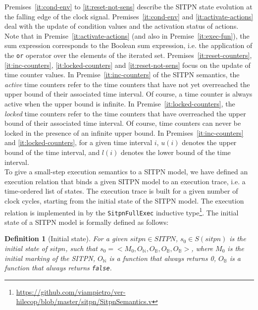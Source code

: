 \documentclass[pdflatex,sn-mathphys]{sn-jnl}%
\theoremstyle{thmstyleone}%
\theoremstyle{thmstyletwo}%
\theoremstyle{thmstylethree}%
\newtheorem{definition}{Definition}%
\begin{document}
Premises~\ref{it:cond-env} to \ref{it:reset-not-sens} describe the
SITPN state evolution at the falling edge of the clock
signal. Premises~\ref{it:cond-env} and \ref{it:activate-actions} deal
with the update of condition values and the activation status of
actions. Note that in Premise~\ref{it:activate-actions} (and also in
Premise~\ref{it:exec-fun}), the sum expression corresponds to the
Boolean sum expression, i.e. the application of the \texttt{or}
operator over the elements of the iterated
set. Premises~\ref{it:reset-counters}, \ref{it:inc-counters},
\ref{it:locked-counters} and \ref{it:reset-not-sens} focus on the
update of time counter values.  In Premise~\ref{it:inc-counters} of
the SITPN semantics, the \emph{active} time counters refer to the time
counters that have not yet overreached the upper bound of their
associated time interval. Of course, a time counter is always active
when the upper bound is infinite. In Premise~\ref{it:locked-counters},
the \emph{locked} time counters refer to the time counters that have
overreached the upper bound of their associated time interval. Of
course, time counters can never be locked in the presence of an
infinite upper bound. In Premises~\ref{it:inc-counters} and
\ref{it:locked-counters}, for a given time interval $i$, $u(i)$
denotes the upper bound of the time interval, and $l(i)$ denotes the
lower bound of the time interval.\\

To give a small-step execution semantics to a SITPN model, we have
defined an execution relation that binds a given SITPN model to an
execution trace, i.e. a time-ordered list of states. The execution
trace is built for a given number of clock cycles, starting from the
initial state of the SITPN model. The execution relation is
implemented in \coq{} by the \texttt{SitpnFullExec} inductive
type\footnote{\url{https://github.com/viampietro/ver-hilecop/blob/master/sitpn/SitpnSemantics.v}}. The
initial state of a SITPN model is formally defined as follows:


\begin{definition}[Initial state]
  \label{def:sitpn-init-state}
  For a given $sitpn\in{}SITPN$, $s_0\in{}S(sitpn)$ is the initial
  state of $sitpn$, such that
  $s_0=<M_0,O_\mathbb{N},O_\mathbb{B},O_\mathbb{B},O_\mathbb{B}>$,
  where $M_0$ is the initial marking of the SITPN, $O_\mathbb{N}$ is a
  function that always returns 0, $O_\mathbb{B}$ is a function that
  always returns \texttt{false}.
\end{definition}
\end{document}
